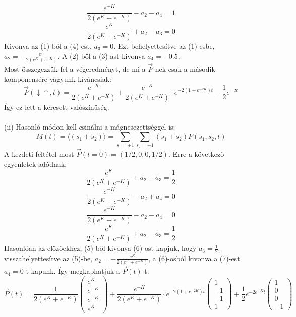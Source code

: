 \documentclass[12pt]{article}
\begin{document}
\begin{equation}
\frac{e^{-K}}{2(e^K+e^{-K})}-a_2-a_4 = 1
\end{equation}
\begin{equation}
\frac{e^K}{2(e^K+e^{-K})}+a_2-a_3 = 0
\end{equation}
Kivonva az (1)-ből a (4)-est, $a_3 = 0$. Ezt behelyettesítve az (1)-esbe, $a_2 = -\frac{e^K}{2(e^K+e^{-K})}$. A (2)-ből a (3)-ast kivonva $ a_4 = -0.5$.\\
Most összegezzük fel a végeredményt, de mi a $\vec{P}$-nek csak a második komponensére vagyunk kíváncsiak:
$$\vec{P}(\downarrow\uparrow, t) = \frac{e^{-K}}{2(e^K+e^{-K})} + \frac{e^{-K}}{2(e^K+e^{-K})}\cdot e^{-2(1 + e^{-2K})t}-\frac{1}{2}e^{-2t}$$
Így ez lett a keresett valószínűség.
\\\\
(ii) Hasonló módon kell csinálni a mágnesezettséggel is:
$$M(t) = \langle( s_1+s_2)\rangle = \sum_{s_1=\pm1}\sum_{s_2=\pm1}(s_1+s_2)P(s_1, s_2, t)$$
A kezdeti feltétel most $\vec{P}(t = 0) = (1/2, 0,0, 1/2)$. Erre a következő egyenletek adódnak:
\begin{equation}
\frac{e^K}{2(e^K+e^{-K})}+a_2+a_3 = \frac{1}{2}
\end{equation}
\begin{equation}
\frac{e^{-K}}{2(e^K+e^{-K})}-a_2+a_4 = 0
\end{equation}
\begin{equation}
\frac{e^{-K}}{2(e^K+e^{-K})}-a_2-a_4 = 0
\end{equation}
\begin{equation}
\frac{e^K}{2(e^K+e^{-K})}+a_2-a_3 = \frac{1}{2}
\end{equation}
Hasonlóan az előzőekhez, (5)-ből kivonva (6)-ost kapjuk, hogy $a_3 = \frac{1}{2}$. visszahelyettesítve az (5)-be, $a_2=-\frac{e^K}{2(e^K+e^{-K})} $, a (6)-osból kivonva a (7)-est $a_4 = 0$-t kapunk. Így megkaphatjuk a $\vec{P}(t)$-t:
\[
\vec{P}(t) = \frac{1}{2(e^K+e^{-K})}
\begin{pmatrix}
e^{K}\\
	e^{-K}\\
	e^{-K}\\
	e^{K}
\end{pmatrix} 
+ \frac{e^{-K}}{2(e^K+e^{-K})}\cdot e^{-2(1 + e^{-2K})t}
\begin{pmatrix}
	1\\
	-1\\
	-1\\
	1
\end{pmatrix}
+ \frac{1}{2}e^{-2e^{-K}t}
\begin{pmatrix}
	1\\
	0\\
	0\\
	-1
\end{pmatrix}
\]
\end{document}
